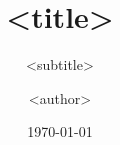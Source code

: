 \documentclass{article} %
\author{<author>}
\date{\noexpand\today} %
\title{<title>}
\subtitle{<subtitle>}
\begin{document}
\imtaMaketitlepage






\imtaMakeCover
\end{document}
